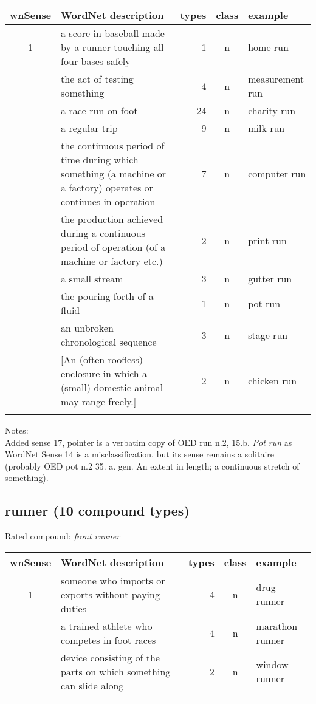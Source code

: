 \noindent
\begin{longtable}{c>{\raggedright\arraybackslash}p{5cm}rc>{\raggedright\arraybackslash}p{2cm}}\lsptoprule
{\small wnSense}&WordNet description&types&class&example\\\midrule
1&a score in baseball made by a runner touching all four bases safely&1&n&home run\\\tablevspace
2&the act of testing something&4&n&measure\-ment run\\\tablevspace
3&a race run on foot&24&n&charity run\\\tablevspace
6&a regular trip&9&n&milk run\\\tablevspace
8&the continuous period of time during which something (a machine or a factory) operates or continues in operation&7&n&computer run\\\tablevspace
10&the production achieved during a continuous period of operation (of a machine or factory etc.)&2&n&print run\\\tablevspace
11&a small stream&3&n&gutter run\\\tablevspace
14&{}the pouring forth of a fluid&1&n&pot run\\\tablevspace
15&an unbroken chronological sequence&3&n&stage run\\\tablevspace
17&{}[An (often roofless) enclosure in which a (small) domestic animal may range freely.]&2&n&chicken run\\\lspbottomrule
\end{longtable}

\pagebreak[4]
\noindent
Notes:\\
Added sense 17, pointer is a verbatim copy of OED run n.2, 15.b. \emph{Pot run} as WordNet Sense 14 is a misclassification, but its sense remains a solitaire (probably OED pot n.2 35. a. gen. An extent in length; a continuous stretch of something).

 


\subsection{runner    (10 compound types)}
Rated compound: \emph{front runner}

\vspace*{1ex}

\noindent
\begin{longtable}{c>{\raggedright\arraybackslash}p{5cm}rc>{\raggedright\arraybackslash}p{2cm}}\lsptoprule
{\small wnSense}&WordNet description&types&class&example\\\midrule
1&someone who imports or exports without paying duties&4&n&drug runner\\\tablevspace
6&a trained athlete who competes in foot races&4&n&marathon runner\\\tablevspace
9&device consisting of the parts on which something can slide along&2&n&window runner\\\lspbottomrule
\end{longtable}
